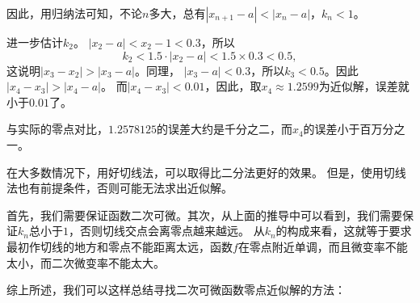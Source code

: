 \documentclass[12pt,UTF8]{ctexbook}
\theoremstyle{definition}
\theoremstyle{plain}
\begin{document}
因此，用归纳法可知，不论$n$多大，总有$|x_{n+1} - a| < |x_n - a|$，$k_n < 1$。

进一步估计$k_2$。
$|x_2 - a| < x_2 - 1 < 0.3$，所以
$$ k_2 < 1.5 \cdot |x_2 - a| < 1.5 \times 0.3 < 0.5, $$
这说明$|x_3 - x_2| > |x_3 - a|$。同理，
$|x_3 - a| < 0.3$，所以$k_3 < 0.5$。因此$|x_4 - x_3| > |x_4 - a|$。
而$|x_4 - x_3| < 0.01$，因此，取$x_4 \approx 1.2599$为近似解，误差就小于$0.01$了。

与实际的零点对比，$1.2578125$的误差大约是千分之二，而$x_4$的误差小于百万分之一。

在大多数情况下，用好切线法，可以取得比二分法更好的效果。
但是，使用切线法也有前提条件，否则可能无法求出近似解。

首先，我们需要保证函数二次可微。其次，从上面的推导中可以看到，我们需要保证$k_n$总小于$1$，否则切线交点会离零点越来越远。
从$k_n$的构成来看，这就等于要求最初作切线的地方和零点不能距离太远，函数$f$在零点附近单调，而且微变率不能太小，而二次微变率不能太大。

综上所述，我们可以这样总结寻找二次可微函数零点近似解的方法：

\begin{center}
\end{center}
\end{document}
